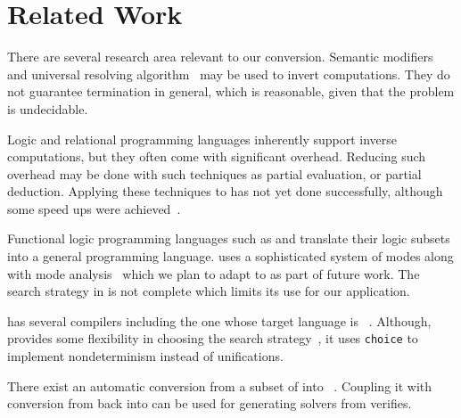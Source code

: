 \section{Related Work}

There are several research area relevant to our conversion.
Semantic modifiers~\cite{abramov2001standard} and universal resolving algorithm~\cite{abramov2002principles} may be used to invert computations.
They do not guarantee termination in general, which is reasonable, given that the problem is undecidable.

Logic and relational programming languages inherently support inverse computations, but they often come with significant overhead.
Reducing such overhead may be done with such techniques as partial evaluation, or partial deduction.
Applying these techniques to \mk has not yet done successfully, although some speed ups were achieved~\cite{EPTCS341.5}.

Functional logic programming languages such as \curry and \mercury translate their logic subsets into a general programming language.
\mercury uses a sophisticated system of modes along with mode analysis~\cite{overton2002constraint} which we plan to adapt to \mk as part of future work.
The search strategy in \mercury is not complete which limits its use for our application.

\curry has several compilers including the one whose target language is \haskell~\cite{brassel2011kics2}.
Although, \curry provides some flexibility in choosing the search strategy~\cite{hanus2012search}, it uses \lstinline{choice} to implement nondeterminism instead of unifications.


There exist an automatic conversion from a subset of \ocaml into \ocanren~\cite{lozov2017typed}.
Coupling it with conversion from \mk back into \ocaml can be used for generating solvers from verifies.


